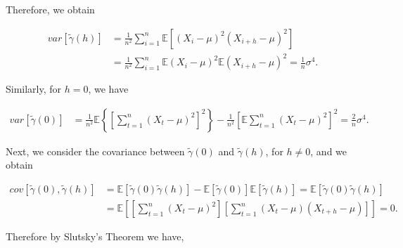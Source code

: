 \documentclass[]{book}
\theoremstyle{definition}
\theoremstyle{definition}
\theoremstyle{definition}
\theoremstyle{remark}
\begin{document}
{Therefore, we obtain

\[\begin{aligned}
        var[\tilde{\gamma} \left( h \right)] &= \frac{1}{n^2}\sum\limits_{i = 1}^{n} \mathbb{E}\left[ {\left( {{X_i} - \mu} \right)^2\left( {{X_{i + h}} - \mu} \right)^2}\right]\\
        &= \frac{1}{n^2}\sum\limits_{i = 1}^{n} \mathbb{E}{\left( {{X_i} - \mu} \right)^2\mathbb{E}\left( {{X_{i + h}} - \mu} \right)^2}
        = \frac{1}{n}\sigma^4.
    \end{aligned}
\]

Similarly, for \(h = 0\), we have

\[
\begin{aligned}
        var[\tilde{\gamma} \left( 0 \right)] &= \frac{1}{n^2}\mathbb{E}\left\{\left[\sum\limits_{t = 1}^{n} {\left( {{X_t} - \mu} \right)^2}\right]^2\right\} - \frac{1}{n^2}\left[\mathbb{E}\sum\limits_{t = 1}^{n} {\left( {{X_t} - \mu} \right)^2}\right]^2
        = \frac{2}{n}\sigma^4.
    \end{aligned}
\]

Next, we consider the covariance between
\(\tilde{\gamma} \left( 0 \right)\) and
\(\tilde{\gamma} \left( h \right)\), for \(h \neq 0\), and we obtain

\[
\begin{aligned}
        cov[\tilde{\gamma} \left( 0 \right), \tilde{\gamma} \left( h \right)] &= \mathbb{E}[\tilde{\gamma} \left( 0 \right) \tilde{\gamma} \left( h \right)] - \mathbb{E}[\tilde{\gamma} \left( 0 \right)] \mathbb{E}[\tilde{\gamma} \left( h \right)]
        = \mathbb{E}[\tilde{\gamma} \left( 0 \right) \tilde{\gamma} \left( h \right)]\\
        &= \mathbb{E}\left[\left[\sum\limits_{t = 1}^{n} {\left( {{X_t} - \mu} \right)^2}\right]\left[\sum\limits_{t = 1}^{n} {\left( {{X_t} - \mu} \right)\left( {{X_{t + h}} - \mu} \right)}\right]\right]
        = 0.
    \end{aligned}
\]

Therefore by Slutsky's Theorem we have,

}
\end{document}
